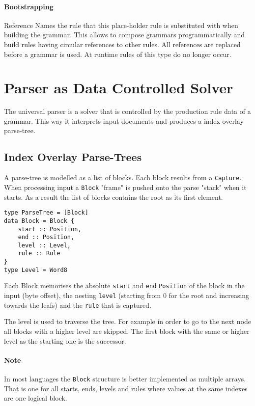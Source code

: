 \documentclass[10pt,a4paper]{article}
\begin{document}
\paragraph{Bootstrapping}
\begin{rulelist}
\item[Reference] Names the rule that this place-holder rule is substituted with when building the grammar. This allows to compose grammars programmatically and build rules having circular references to other rules. All references are replaced before a grammar is used. At runtime rules of this type do no longer occur.
\end{rulelist}

\section{Parser as Data Controlled Solver}
The universal parser is a solver that is controlled by the production rule data of a grammar. This way it interprets input documents and produces a index overlay parse-tree.

\subsection{Index Overlay Parse-Trees}
A parse-tree is modelled as a list of blocks. Each block results from a \texttt{Capture}. When processing input a \texttt{Block} "frame" is pushed onto the parse "stack" when it starts. As a result the list of blocks contains the root as its first element. 
\begin{lstlisting}
type ParseTree = [Block]
data Block = Block { 
	start :: Position,
	end :: Position,
	level :: Level,
	rule :: Rule
}
type Level = Word8
\end{lstlisting}
Each Block memorises the absolute \texttt{start} and \texttt{end} \texttt{Position} of the block in the input (byte offset), the nesting \texttt{level} (starting from 0 for the root and increasing towards the leafs) and the \texttt{rule} that is captured. 

The level is used to traverse the tree. For example in order to go to the next node all blocks with a higher level are skipped. The first block with the same or higher level as the starting one is the successor.

\paragraph{Note} In most languages the \texttt{Block} structure is better implemented as multiple arrays. That is one for all starts, ends, levels and rules where values at the same indexes are one logical block.
\end{document}
